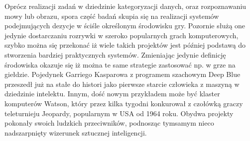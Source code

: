 \begin{par}
Oprócz realizacji zadań w dziedzinie kategoryzacji danych, oraz rozpoznawaniu mowy lub obrazu, spora część badań skupia się na realizacji systemów podejmujących dezycje w ściśle określonym środowisku gry.
Pozornie służą one jedynie dostarczaniu rozrywki w szeroko popularnych grach komputerowych, szybko można się przekonać iż wiele takich projektów jest później podstawą do stworzenia bardziej praktycznych systemów. Zmieniając jedynie definicję środowiska okazuje się iż można te same strategie zastosować np. w grze na giełdzie.
Pojedynek Garriego Kasparowa z programem szachowym Deep Blue przeszedł już na stałe do histori jako pierwsze starcie człowieka z maszyną w dziedzinie intelektu. 
Innym, dość nowym przykładem może być klaster komputerów Watson, który przez kilka tygodni konkurował z czołówką graczy teleturnieju Jeopardy, popularnym w USA od 1964 roku.
Obydwa projekty pokonały swoich ludzkich przeciwników, podnosząc tymsamym nieco nadszarpnięty wizerunek sztucznej inteligencji.
\end{par}
